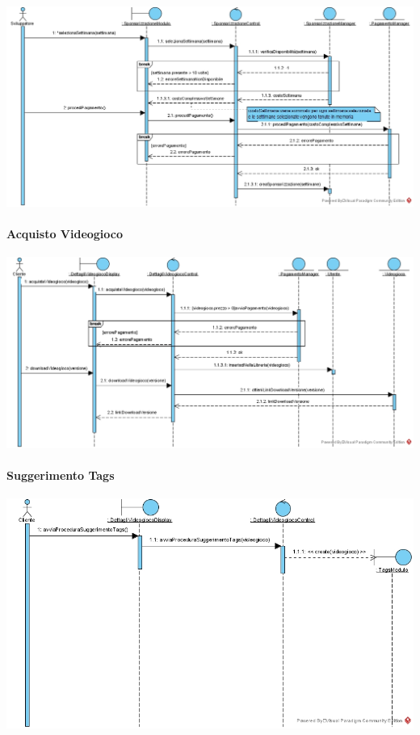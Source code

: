 \begin{center}
\includegraphics[width=\textwidth,height=\textheight,keepaspectratio]{Figure/SequenceDiagrams/SponsorizzazioneVideogiocoInner.jpg}
\end{center}

\newpage
\paragraph{Acquisto Videogioco}
\begin{center}
\includegraphics[width=\textwidth,height=\textheight,keepaspectratio]{Figure/SequenceDiagrams/AcquistoVideogioco.jpg}
\end{center}

\paragraph{Suggerimento Tags}
\begin{center}
\includegraphics[width=\textwidth,height=\textheight,keepaspectratio]{Figure/SequenceDiagrams/SuggerimentoTagsEntry.jpg}
\end{center}

